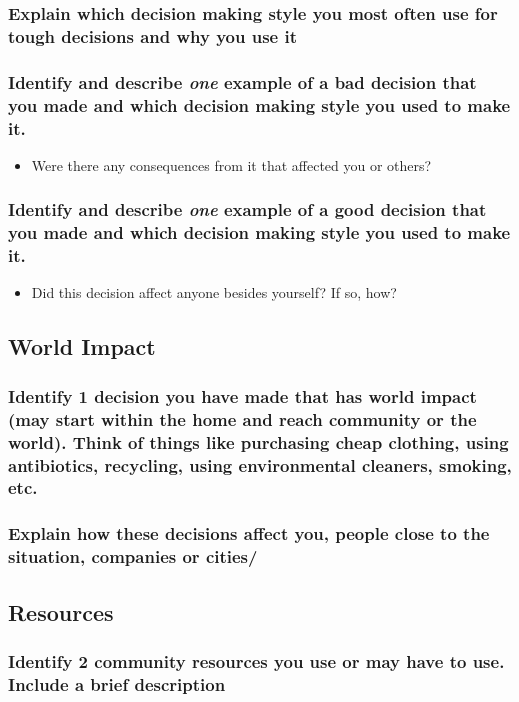 \documentclass[11pt]{article}
\begin{document}
\subsubsection*{Explain which decision making style you most often use for tough decisions and why you use it}
\label{sec:org7cc6daf}
\subsubsection*{Identify and describe \emph{one} example of a bad decision that you made and which decision making style you used to make it.}
\label{sec:orgce26ce2}
\begin{itemize}
\item Were there any consequences from it that affected you or others?
\label{sec:orgd671648}
\end{itemize}
\subsubsection*{Identify and describe \emph{one} example of a good decision that you made and which decision making style you used to make it.}
\label{sec:org904dd1e}
\begin{itemize}
\item Did this decision affect anyone besides yourself? If so, how?
\label{sec:orga98d96f}
\end{itemize}
\subsection*{World Impact}
\label{sec:orgba0460a}
\subsubsection*{Identify 1 decision you have made that has world impact (may start within the home and reach community or the world). Think of things like purchasing cheap clothing, using antibiotics, recycling, using environmental cleaners, smoking, etc.}
\label{sec:org7834634}
\subsubsection*{Explain how these decisions affect you, people close to the situation, companies or cities/}
\label{sec:org4d74c7a}
\subsection*{Resources}
\label{sec:orga35abd6}
\subsubsection*{Identify 2 community resources you use or may have to use. Include a brief description}
\label{sec:org6cb9b7a}
\end{document}
